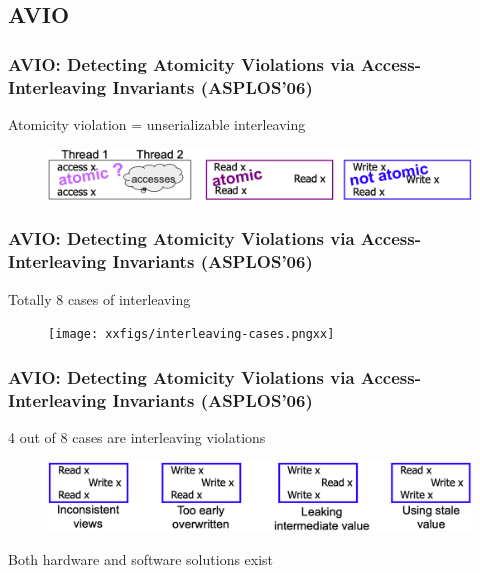 \subsection{AVIO} %
\begin{frame}[fragile]
    \frametitle{AVIO: Detecting Atomicity Violations via Access-Interleaving Invariants (ASPLOS’06)}

Atomicity violation = unserializable interleaving

    \begin{figure}
    \includegraphics[width=0.4\linewidth]{figs/serialization.png}
    \end{figure}
\end{frame}
% 
% 
% 
% 
% 
\begin{frame}[fragile]
    \frametitle{AVIO: Detecting Atomicity Violations via Access-Interleaving Invariants (ASPLOS’06)}

Totally 8 cases of interleaving

    \begin{figure}
    \texttt{[image: xxfigs/interleaving-cases.pngxx]}
    \end{figure}
\end{frame}
% 
% 
% 
\begin{frame}[fragile]
    \frametitle{AVIO: Detecting Atomicity Violations via Access-Interleaving Invariants (ASPLOS’06)}

4 out of 8 cases are interleaving violations

    \begin{figure}
    \includegraphics[width=0.4\linewidth]{figs/interleaving-violations.png}
    \end{figure}

Both hardware and software solutions exist

\end{frame}
% 
% 
% 
% 
% 
% 
% 
